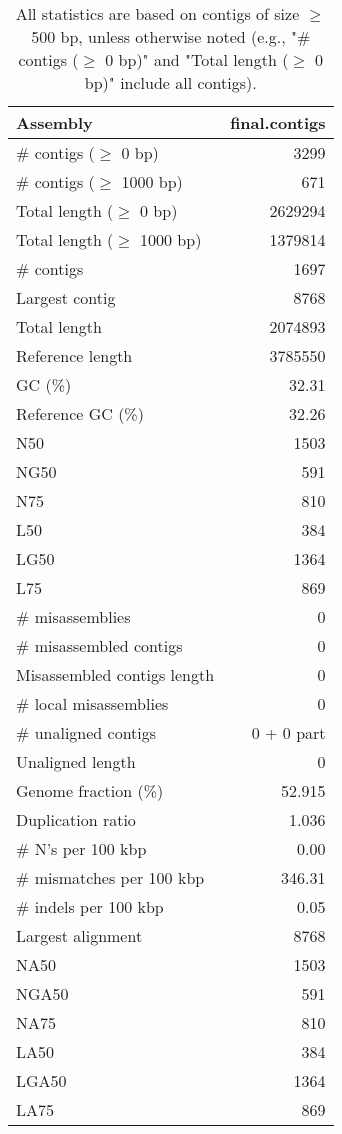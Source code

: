 \documentclass[12pt,a4paper]{article}
\begin{document}
\begin{table}[ht]
\begin{center}
\caption{All statistics are based on contigs of size $\geq$ 500 bp, unless otherwise noted (e.g., "\# contigs ($\geq$ 0 bp)" and "Total length ($\geq$ 0 bp)" include all contigs).}
\begin{tabular}{|l*{1}{|r}|}
\hline
Assembly & final.contigs \\ \hline
\# contigs ($\geq$ 0 bp) & 3299 \\ \hline
\# contigs ($\geq$ 1000 bp) & 671 \\ \hline
Total length ($\geq$ 0 bp) & 2629294 \\ \hline
Total length ($\geq$ 1000 bp) & 1379814 \\ \hline
\# contigs & 1697 \\ \hline
Largest contig & 8768 \\ \hline
Total length & 2074893 \\ \hline
Reference length & 3785550 \\ \hline
GC (\%) & 32.31 \\ \hline
Reference GC (\%) & 32.26 \\ \hline
N50 & 1503 \\ \hline
NG50 & 591 \\ \hline
N75 & 810 \\ \hline
L50 & 384 \\ \hline
LG50 & 1364 \\ \hline
L75 & 869 \\ \hline
\# misassemblies & 0 \\ \hline
\# misassembled contigs & 0 \\ \hline
Misassembled contigs length & 0 \\ \hline
\# local misassemblies & 0 \\ \hline
\# unaligned contigs & 0 + 0 part \\ \hline
Unaligned length & 0 \\ \hline
Genome fraction (\%) & 52.915 \\ \hline
Duplication ratio & 1.036 \\ \hline
\# N's per 100 kbp & 0.00 \\ \hline
\# mismatches per 100 kbp & 346.31 \\ \hline
\# indels per 100 kbp & 0.05 \\ \hline
Largest alignment & 8768 \\ \hline
NA50 & 1503 \\ \hline
NGA50 & 591 \\ \hline
NA75 & 810 \\ \hline
LA50 & 384 \\ \hline
LGA50 & 1364 \\ \hline
LA75 & 869 \\ \hline
\end{tabular}
\end{center}
\end{table}
\end{document}
